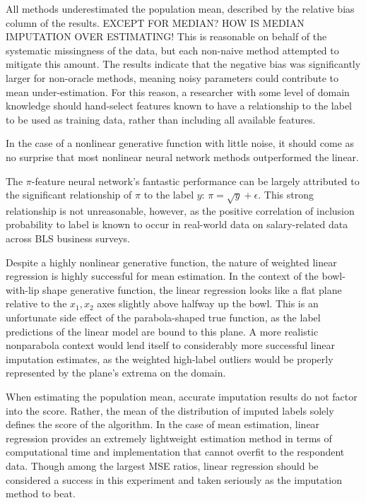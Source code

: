 \documentclass[12pt,twoside]{reedthesis}
\begin{document}
All methods underestimated the population mean, described by the
relative bias column of the results. EXCEPT FOR MEDIAN? HOW IS MEDIAN
IMPUTATION OVER ESTIMATING! This is reasonable on behalf of the
systematic missingness of the data, but each non-naive method attempted
to mitigate this amount. The results indicate that the negative bias was
significantly larger for non-oracle methods, meaning noisy parameters
could contribute to mean under-estimation. For this reason, a researcher
with some level of domain knowledge should hand-select features known to
have a relationship to the label to be used as training data, rather
than including all available features.

In the case of a nonlinear generative function with little noise, it
should come as no surprise that most nonlinear neural network methods
outperformed the linear.

The \(\pi\)-feature neural network's fantastic performance can be
largely attributed to the significant relationship of \(\pi\) to the
label \(y\): \(\pi = \sqrt{y} + \epsilon\). This strong relationship is
not unreasonable, however, as the positive correlation of inclusion
probability to label is known to occur in real-world data on
salary-related data across BLS business surveys.

Despite a highly nonlinear generative function, the nature of weighted
linear regression is highly successful for mean estimation. In the
context of the bowl-with-lip shape generative function, the linear
regression looks like a flat plane relative to the \(x_1, x_2\) axes
slightly above halfway up the bowl. This is an unfortunate side effect
of the parabola-shaped true function, as the label predictions of the
linear model are bound to this plane. A more realistic nonparabola
context would lend itself to considerably more successful linear
imputation estimates, as the weighted high-label outliers would be
properly represented by the plane's extrema on the domain.

When estimating the population mean, accurate imputation results do not
factor into the score. Rather, the mean of the distribution of imputed
labels solely defines the score of the algorithm. In the case of mean
estimation, linear regression provides an extremely lightweight
estimation method in terms of computational time and implementation that
cannot overfit to the respondent data. Though among the largest MSE
ratios, linear regression should be considered a success in this
experiment and taken seriously as the imputation method to beat.
\end{document}
